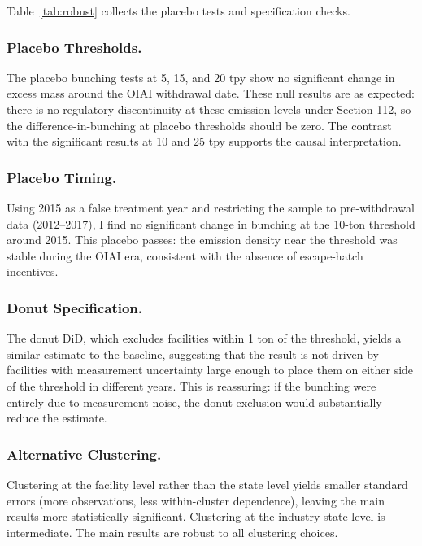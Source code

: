 \documentclass[12pt]{article}
\begin{document}
Table~\ref{tab:robust} collects the placebo tests and specification checks.



\subsubsection*{Placebo Thresholds.}
The placebo bunching tests at 5, 15, and 20 tpy show no significant change in excess mass around the OIAI withdrawal date. These null results are as expected: there is no regulatory discontinuity at these emission levels under Section 112, so the difference-in-bunching at placebo thresholds should be zero. The contrast with the significant results at 10 and 25 tpy supports the causal interpretation.

\subsubsection*{Placebo Timing.}
Using 2015 as a false treatment year and restricting the sample to pre-withdrawal data (2012--2017), I find no significant change in bunching at the 10-ton threshold around 2015. This placebo passes: the emission density near the threshold was stable during the OIAI era, consistent with the absence of escape-hatch incentives.

\subsubsection*{Donut Specification.}
The donut DiD, which excludes facilities within 1 ton of the threshold, yields a similar estimate to the baseline, suggesting that the result is not driven by facilities with measurement uncertainty large enough to place them on either side of the threshold in different years. This is reassuring: if the bunching were entirely due to measurement noise, the donut exclusion would substantially reduce the estimate.

\subsubsection*{Alternative Clustering.}
Clustering at the facility level rather than the state level yields smaller standard errors (more observations, less within-cluster dependence), leaving the main results more statistically significant. Clustering at the industry-state level is intermediate. The main results are robust to all clustering choices.
\end{document}
